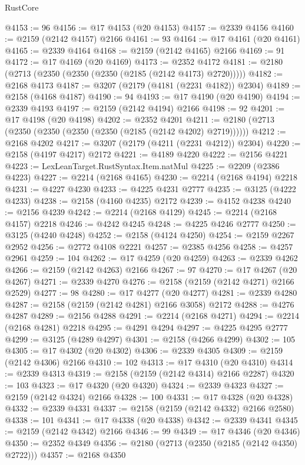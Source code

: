 \begin{lexlean}{RustCore}
\begin{coremodule}
@4153 := 96
@4156 := @17 @4153 (@20 @4153)
@4157 := @2339 @4156
@4160 := @2159 (@2142 @4157) @2166
@4161 := 93
@4164 := @17 @4161 (@20 @4161)
@4165 := @2339 @4164
@4168 := @2159 (@2142 @4165) @2166
@4169 := 91
@4172 := @17 @4169 (@20 @4169)
@4173 := @2352 @4172
@4181 := @2180 (@2713 (@2350 (@2350 (@2350 (@2185 (@2142 @4173) @2720)))))
@4182 := @2168 @4173
@4187 := @3207 (@2179 (@4181 (@2231 @4182)) @2304)
@4189 := @2158 (@4168 @4187)
@4190 := 94
@4193 := @17 @4190 (@20 @4190)
@4194 := @2339 @4193
@4197 := @2159 (@2142 @4194) @2166
@4198 := 92
@4201 := @17 @4198 (@20 @4198)
@4202 := @2352 @4201
@4211 := @2180 (@2713 (@2350 (@2350 (@2350 (@2350 (@2185 (@2142 @4202) @2719))))))
@4212 := @2168 @4202
@4217 := @3207 (@2179 (@4211 (@2231 @4212)) @2304)
@4220 := @2158 (@4197 @4217) @2172
@4221 := @4189 @4220
@4222 := @2156 @4221
@4223 := LexLeanTarget.RustSyntax.Item.natMul
@4225 := @2209 (@2386 @4223)
@4227 := @2214 (@2168 @4165)
@4230 := @2214 (@2168 @4194) @2218
@4231 := @4227 @4230
@4233 := @4225 @4231 @2777
@4235 := @3125 (@4222 @4233)
@4238 := @2158 (@4160 @4235) @2172
@4239 := @4152 @4238
@4240 := @2156 @4239
@4242 := @2214 (@2168 @4129)
@4245 := @2214 (@2168 @4157) @2218
@4246 := @4242 @4245
@4248 := @4225 @4246 @2777
@4250 := @3125 (@4240 @4248)
@4252 := @2158 (@4124 @4250)
@4254 := @2159 @2267 @2952
@4256 := @2772 @4108 @2221
@4257 := @2385 @4256
@4258 := @4257 @2961
@4259 := 104
@4262 := @17 @4259 (@20 @4259)
@4263 := @2339 @4262
@4266 := @2159 (@2142 @4263) @2166
@4267 := 97
@4270 := @17 @4267 (@20 @4267)
@4271 := @2339 @4270
@4276 := @2158 (@2159 (@2142 @4271) @2166 @2529)
@4277 := 98
@4280 := @17 @4277 (@20 @4277)
@4281 := @2339 @4280
@4287 := @2158 (@2159 (@2142 @4281) @2166 @3058) @2172
@4288 := @4276 @4287
@4289 := @2156 @4288
@4291 := @2214 (@2168 @4271)
@4294 := @2214 (@2168 @4281) @2218
@4295 := @4291 @4294
@4297 := @4225 @4295 @2777
@4299 := @3125 (@4289 @4297)
@4301 := @2158 (@4266 @4299)
@4302 := 105
@4305 := @17 @4302 (@20 @4302)
@4306 := @2339 @4305
@4309 := @2159 (@2142 @4306) @2166
@4310 := 102
@4313 := @17 @4310 (@20 @4310)
@4314 := @2339 @4313
@4319 := @2158 (@2159 (@2142 @4314) @2166 @2287)
@4320 := 103
@4323 := @17 @4320 (@20 @4320)
@4324 := @2339 @4323
@4327 := @2159 (@2142 @4324) @2166
@4328 := 100
@4331 := @17 @4328 (@20 @4328)
@4332 := @2339 @4331
@4337 := @2158 (@2159 (@2142 @4332) @2166 @2580)
@4338 := 101
@4341 := @17 @4338 (@20 @4338)
@4342 := @2339 @4341
@4345 := @2159 (@2142 @4342) @2166
@4346 := 99
@4349 := @17 @4346 (@20 @4346)
@4350 := @2352 @4349
@4356 := @2180 (@2713 (@2350 (@2185 (@2142 @4350) @2722)))
@4357 := @2168 @4350

\end{coremodule}
\end{lexlean}
